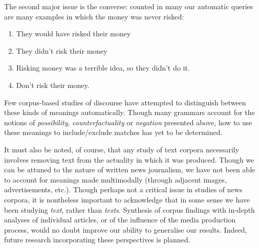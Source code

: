         The second major issue is the converse: counted in many our automatic queries are many examples in which the money was never risked:

        \begin{enumerate} [before=\itshape,font=\normalfont] \setlength\itemsep{0em} \small
            \item They would have risked their money
            \item They didn't risk their money
            \item Risking money was a terrible idea, so they didn't do it.
            \item Don't risk their money.
        \end{enumerate}

        Few corpus-based studies of discourse have attempted to distinguish between these kinds of meanings automatically. Though many grammars account for the notions of \emph{possibility}, \emph{counterfactuality} or \emph{negation} presented above, how to use these meanings to include\slash exclude matches has yet to be determined.

        It must also be noted, of course, that any study of text corpora necessarily involves removing text from the actuality in which it was produced. Though we can be attuned to the nature of written news journalism, we have not been able to account for meanings made multimodally (through adjacent images, advertisements, etc.). Though perhaps not a critical issue in studies of news corpora, it is nontheless important to acknowledge that in some sense we have been studying \emph{text}, rather than \emph{texts}. Synthesis of corpus findings with in-depth analyses of individual articles, or of the influence of the media production process, would no doubt improve our ability to generalise our results. Indeed, future research incorporating these perspectives is planned.




